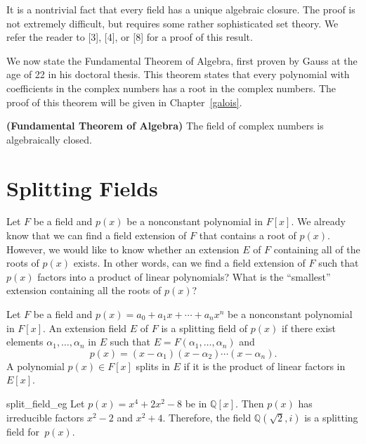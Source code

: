 It is a nontrivial fact that every field has a unique algebraic
closure. The proof is not extremely difficult, but requires some rather
sophisticated set theory. We refer the reader to [3], [4], or [8] for
a proof of this result.   %


We now state the  Fundamental Theorem of Algebra, first proven by
Gauss at the age of 22 in his doctoral thesis. This theorem states
that every polynomial with coefficients in the complex numbers has a
root in the complex numbers.  The proof of this theorem will be given
in Chapter~\ref{galois}.  
 

\begin{theorem} {\bf (Fundamental Theorem of
Algebra)}
The field of complex numbers is algebraically closed.
\end{theorem}


 
\section{Splitting Fields}


Let $F$ be a field and $p(x)$ be a nonconstant polynomial in $F[x]$.
We already know that we can find a field extension of $F$ that
contains a root of $p(x)$. However, we would like to know whether an
extension $E$ of $F$ containing all of the roots of $p(x)$ exists.
In other words, can we find a field extension of $F$ such that $p(x)$
factors into a product of linear polynomials? What is the ``smallest''
extension containing all the roots of $p(x)$? 

 
Let $F$ be a field and $p(x) = a_0 + a_1 x + \cdots + a_n x^n$ be a
nonconstant polynomial in $F[x]$. An extension field $E$ of $F$ is a
{\bfi splitting field\/}
of $p(x)$ if there exist elements $\alpha_1, \ldots, \alpha_n$ in $E$
such that $E = F( \alpha_1, \ldots, \alpha_n )$ and 
\[
p(x) = ( x - \alpha_1 )(x - \alpha_2) \cdots (x - \alpha_n).
\]
A polynomial $p(x) \in F[x]$ {\bfi splits\/} in $E$ if it is the
product of linear factors in~$E[x]$.   
 

\begin{example}{split_field_eg}
Let $p(x) = x^4 + 2x^2 - 8$ be in ${\mathbb Q}[x]$. Then $p(x)$ has
irreducible factors $x^2 -2$ and $x^2 + 4$. Therefore, the field
${\mathbb Q}( \sqrt{2}, i )$ is a splitting field for~$p(x)$. 
\end{example}
 

